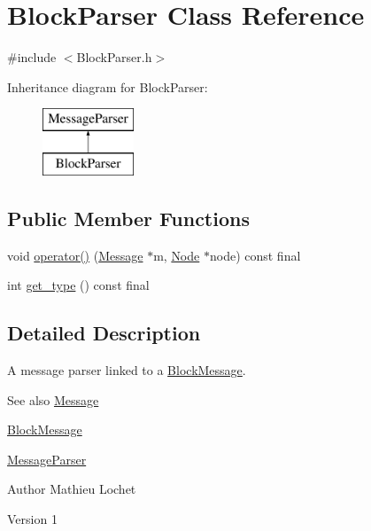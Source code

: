 \hypertarget{classBlockParser}{}\section{Block\+Parser Class Reference}
\label{classBlockParser}


{\ttfamily \#include $<$Block\+Parser.\+h$>$}

Inheritance diagram for Block\+Parser\+:\begin{figure}[H]
\begin{center}
\leavevmode
\includegraphics[height=2.000000cm]{classBlockParser}
\end{center}
\end{figure}
\subsection*{Public Member Functions}
\begin{DoxyCompactItemize}
\item 
void \mbox{\hyperlink{classBlockParser_acc2f5e6a6d3a30464454cfc85ff7ba9a}{operator()}} (\mbox{\hyperlink{classMessage}{Message}} $\ast$m, \mbox{\hyperlink{classNode}{Node}} $\ast$node) const final
\item 
int \mbox{\hyperlink{classBlockParser_aa7334a81b976ec6244c0992cda44a824}{get\+\_\+type}} () const final
\end{DoxyCompactItemize}


\subsection{Detailed Description}
A message parser linked to a \mbox{\hyperlink{classBlockMessage}{Block\+Message}}. \begin{DoxySeeAlso}{See also}
\mbox{\hyperlink{classMessage}{Message}} 

\mbox{\hyperlink{classBlockMessage}{Block\+Message}} 

\mbox{\hyperlink{classMessageParser}{Message\+Parser}}
\end{DoxySeeAlso}
\begin{DoxyAuthor}{Author}
Mathieu Lochet 
\end{DoxyAuthor}
\begin{DoxyVersion}{Version}
1 
\end{DoxyVersion}


